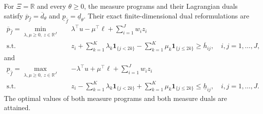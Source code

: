 \begin{theorem}
  \label{thm-finite-dual-reformulations}
  For $\Xi=\mathbb R$ and every $\theta\ge0$, the measure programs and their Lagrangian duals satisfy
  $\overline p_{\hat f}=\overline d_\theta$ and $\underline p_{\hat f}=\underline d_\theta$.
  Their exact finite-dimensional dual reformulations are
  \begin{equation}
    \begin{aligned}
      \overline p_{\hat f}=\min_{\lambda,\mu\ge0,\ z\in\mathbb R^J}\quad&
      \lambda^\top u-\mu^\top\ell+\sum_{i=1}^Jw_i z_i\\
      \text{s.t.}\quad&
      z_i+\sum_{k=1}^K\lambda_k\mathbf1_{\{j<2k\}}
      -\sum_{k=1}^K\mu_k\mathbf1_{\{j\le2k\}}
      \ge\overline h_{ij},\quad i,j=1,\ldots,J,
    \end{aligned}
    \label{eq-finite-upper-dual}
  \end{equation}
  and
  \begin{equation}
    \begin{aligned}
      \underline p_{\hat f}=\max_{\lambda,\mu\ge0,\ z\in\mathbb R^J}\quad&
      -\lambda^\top u+\mu^\top\ell+\sum_{i=1}^Jw_i z_i\\
      \text{s.t.}\quad&
      z_i-\sum_{k=1}^K\lambda_k\mathbf1_{\{j<2k\}}
      +\sum_{k=1}^K\mu_k\mathbf1_{\{j\le2k\}}
      \le\underline h_{ij},\quad i,j=1,\ldots,J.
    \end{aligned}
    \label{eq-finite-lower-dual}
  \end{equation}
  The optimal values of both measure programs and both measure duals are attained.
\end{theorem}
